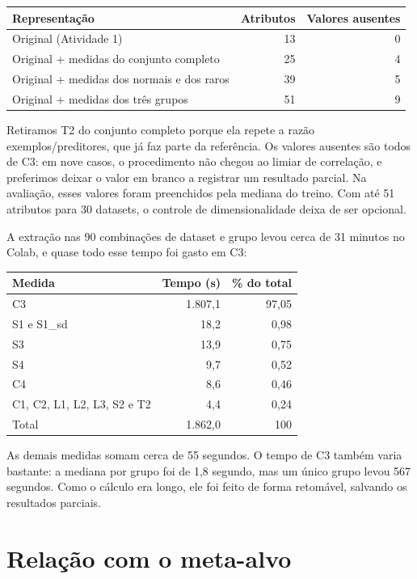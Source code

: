 \documentclass[10pt,a4paper]{article}
\begin{document}
\begin{center}
\small
\begin{tabular}{lrr}
\toprule
Representação & Atributos & Valores ausentes \\
\midrule
Original (Atividade 1) & 13 & 0 \\
Original + medidas do conjunto completo & 25 & 4 \\
Original + medidas dos normais e dos raros & 39 & 5 \\
Original + medidas dos três grupos & 51 & 9 \\
\bottomrule
\end{tabular}
\end{center}

Retiramos T2 do conjunto completo porque ela repete a razão exemplos/preditores, que já faz parte da referência. Os valores ausentes são todos de C3: em nove casos, o procedimento não chegou ao limiar de correlação, e preferimos deixar o valor em branco a registrar um resultado parcial. Na avaliação, esses valores foram preenchidos pela mediana do treino. Com até 51 atributos para 30 datasets, o controle de dimensionalidade deixa de ser opcional.

A extração nas 90 combinações de dataset e grupo levou cerca de 31 minutos no Colab, e quase todo esse tempo foi gasto em C3:

\begin{center}
\small
\begin{tabular}{lrr}
\toprule
Medida & Tempo (s) & \% do total \\
\midrule
C3 & 1.807,1 & 97,05 \\
S1 e S1\_sd & 18,2 & 0,98 \\
S3 & 13,9 & 0,75 \\
S4 & 9,7 & 0,52 \\
C4 & 8,6 & 0,46 \\
C1, C2, L1, L2, L3, S2 e T2 & 4,4 & 0,24 \\
\midrule
Total & 1.862,0 & 100 \\
\bottomrule
\end{tabular}
\end{center}

As demais medidas somam cerca de 55 segundos. O tempo de C3 também varia bastante: a mediana por grupo foi de 1,8 segundo, mas um único grupo levou 567 segundos. Como o cálculo era longo, ele foi feito de forma retomável, salvando os resultados parciais.

\section{Relação com o meta-alvo}
\end{document}
